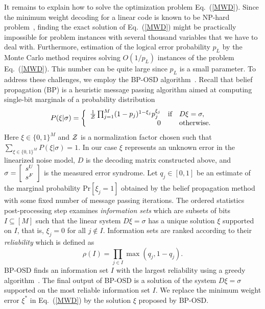 \documentclass{article}
\begin{document}
It remains to explain how to solve the optimization problem Eq.~(\ref{MWD}).
Since the minimum weight decoding for a linear code
 is known to be NP-hard problem~\cite{berlekamp1978inherent}, finding the exact solution
of Eq.~(\ref{MWD}) might be practically impossible for problem instances with 
several thousand variables that we
have to deal with. 
Furthermore, estimation of the logical error probability $p_L$
by the Monte Carlo method  requires solving $O(1/p_L)$
instances of the problem Eq.~(\ref{MWD}).
This number can be quite large since $p_L$ is a  small parameter. 
To address these challenges,  we employ the BP-OSD 
algorithm~\cite{panteleev2021degenerate,roffe2020decoding}.
Recall that 
belief propagation (BP)  is a heuristic message passing algorithm
aimed at  computing single-bit marginals
of a probability distribution 
\[
P(\xi|\sigma) =\left\{
\ba{rcl}
\frac1{\calZ} \prod_{j=1}^M (1-p_j)^{1-\xi_j} p_j^{\xi_j} & \mbox{if} & D\xi = \sigma,\\
0 && \mbox{otherwise}.\\
\ea
\right.
\]
Here  $\xi \in \{0,1\}^M$ and
 $\calZ$ is a normalization factor chosen such that $\sum_{\xi \in \{0,1\}^M} P(\xi|\sigma)=1$.
In our case $\xi$ represents an unknown error in the linearized
noise model, $D$ is the decoding matrix constructed above,
and $\sigma =\left[
\ba{c}
s^U  \\ 
s^F \\
\ea
\right]$ is the measured error syndrome.
Let $q_j\in [0,1]$ be an estimate of the marginal probability $\mathrm{Pr}[\xi_j=1]$
obtained by the belief propagation method with some fixed number of message
passing iterations. The 
ordered statistics
post-processing step
examines {\em information sets}
which are subsets of bits  $I \subseteq [M]$
such that the linear system $D\xi =\sigma$ has a unique solution $\xi$
supported on $I$, that is, $\xi_j=0$ for all $j\notin I$.
Information sets are ranked according to their {\em reliability}
which is defined as 
\[
\rho(I)= \prod_{j\in I} \max{(q_j,1-q_j)}.
\]
BP-OSD finds an information set $I$ with the largest reliability using a
greedy algorithm~\cite{panteleev2021degenerate}.  The final output
of BP-OSD is a 
solution of the system $D\xi=\sigma$
supported on the most reliable information set $I$.
We replace the minimum weight error $\xi^*$ in Eq.~(\ref{MWD})
by the solution $\xi$
proposed by BP-OSD.
\end{document}
